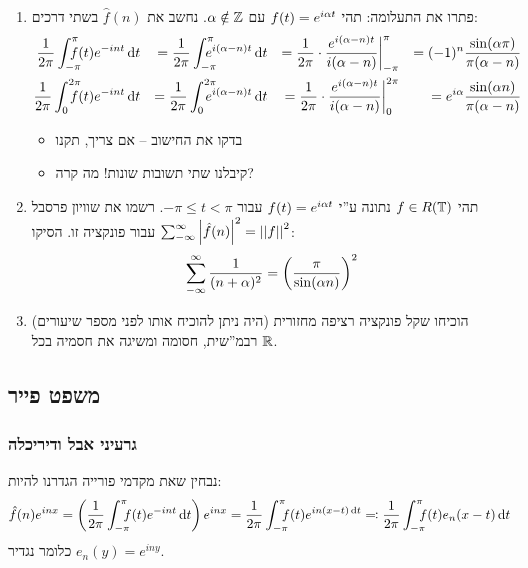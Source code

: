 \documentclass[name=רשימות חדו''א 2א]{../../../tex/classes/noChapterMegasumPreamble}
\begin{document}
	\begin{Exercise}[פתיחה]
		\begin{enumerate}
			\item פתרו את התעלומה: תהי $f(t) = e^{i\alpha t}$ עם $\alpha \notin \mathbb{Z}$. נחשב את $\hat f(n)$ בשתי דרכים:
			\begin{alignat*}{9}
				\frac{1}{2\pi}\int^{\pi}_{-\pi}\dequad f(t) e^{-int}\dt &&= \frac{1}{2\pi}\int^{\pi}_{-\pi}\dequad e^{i(\ag - n)t}\dt &&= \frac{1}{2\pi} \cdot \frac{e^{i(\ag - n)t}}{i(\ag - n)}\bigg\vert^{\pi}_{-\pi}   &&= (-1)^{n}\frac{\sin(\ag \pi)}{\pi(\ag - n)} \\
				\frac{1}{2\pi}\int^{2\pi}_0 \dequad f(t)e^{-int}\dt     &&= \frac{1}{2\pi}\int^{2\pi}_0\dequad e^{i(\ag - n)t}\dt     &&= \frac{1}{2\pi} \cdot \frac{e^{i(\ag -n)t}}{i(\ag - n)}\bigg\vert^{2\pi}_0        &&= e^{i\ag}\frac{\sin(\ag n)}{\pi(\ag - n)}
			\end{alignat*}
			\begin{itemize}
				\item בדקו את החישוב – אם צריך, תקנו
				\item קיבלנו שתי תשובות שונות! מה קרה?
			\end{itemize}
			\item תהי $f \in R(\mathbb{T})$ נתונה ע''י $f(t) = e^{i \alpha t}$ עבור $-\pi \le t < \pi$. רשמו את שוויון פרסבל $\sum_{-\infty}^{\infty}\left \lvert \hat f(n) \right \rvert^{2} = \left \vert \left \vert f \right \vert \right \vert^{2}$ עבור פונקציה זו. הסיקו:
			\[ \sum_{-\infty}^{\infty}\frac{1}{(n + \alpha)^{2}} = \left ( \frac{\pi}{\sin(\alpha n)} \right )^{2} \]
			\item (היה ניתן להוכיח אותו לפני מספר שיעורים) הוכיחו שקל פונקציה רציפה מחזורית רבמ''שית, חסומה ומשיגה את חסמיה בכל $\mathbb{R}$.
		\end{enumerate}
	\end{Exercise}

\subsection{משפט פייר}
\subsubsection{גרעיני אבל ודיריכלה}
	נבחין שאת מקדמי פורייה הגדרנו להיות:
	\[ \hat f(n) e^{inx} = \cl{\frac{1}{2\pi}\int^{\pi}_{-\pi}\dequad \ f(t)e^{-int}\dt}e^{inx} = \frac{1}{2\pi}\int^{\pi}_{-\pi}\dequad \ f(t)e^{in(x - t)\dt} \doc \frac{1}{2\pi}\int^{\pi}_{-\pi}\dequad \ f(t)e_n(x - t)\dt \]
	כלומר נגדיר $e_n(y) = e^{iny}$.
\end{document}
